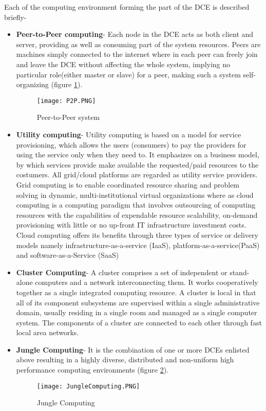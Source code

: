 Each of the computing environment forming the part of the DCE is described briefly-
\begin{itemize}
\item \textbf{Peer-to-Peer computing}- Each node in the DCE acts as both client and server, providing as well as consuming part of the system resources. Peers are machines simply connected to the internet where in each peer can freely join and leave the DCE without affecting the whole system, implying no particular role(either master or slave) for a peer, making such a system self-organizing (figure \ref{fig:P2P}).

\begin{figure}[ht!]
\centering
\texttt{[image: P2P.PNG]}
\caption{Peer-to-Peer system}
\label{fig:P2P}
\end{figure}

\item \textbf{Utility computing}- Utility computing is based on a model for service provisioning, which allows the users (consumers) to pay the providers for using the service only when they need to. It emphasizes on a business model, by which services provide make available the requested/paid resources to the costumers. All grid/cloud platforms are regarded as utility service providers. Grid computing is to enable coordinated resource sharing and problem solving in dynamic, multi-institutional virtual organizations where as cloud computing is a computing paradigm that involves outsourcing of computing resources with the capabilities of expendable resource scalability, on-demand provisioning with little or no up-front IT infrastructure investment costs. Cloud computing offers its benefits through
three types of service or delivery models namely infrastructure-as-a-service (IaaS), platform-as-a-service(PaaS) and software-as-a-Service (SaaS) 

\item \textbf{Cluster Computing}- A cluster comprises a set of independent or stand-alone computers and a network interconnecting them. It
works cooperatively together as a single integrated computing resource. A cluster is local in that all of its component subsystems are supervised within a single administrative domain, usually residing in a single room and managed as a single computer system. The components of a cluster are connected to each other through fast local area networks. 

\item \textbf{Jungle Computing}- It is the combination of one or more DCEs enlisted above resulting in a highly diverse, distributed and non-uniform high performance computing environments (figure \ref{fig:JungleComputing}).  

\begin{figure}[ht!]
\centering
\texttt{[image: JungleComputing.PNG]}
\caption{Jungle Computing}
\label{fig:JungleComputing}
\end{figure}

\end{itemize}

